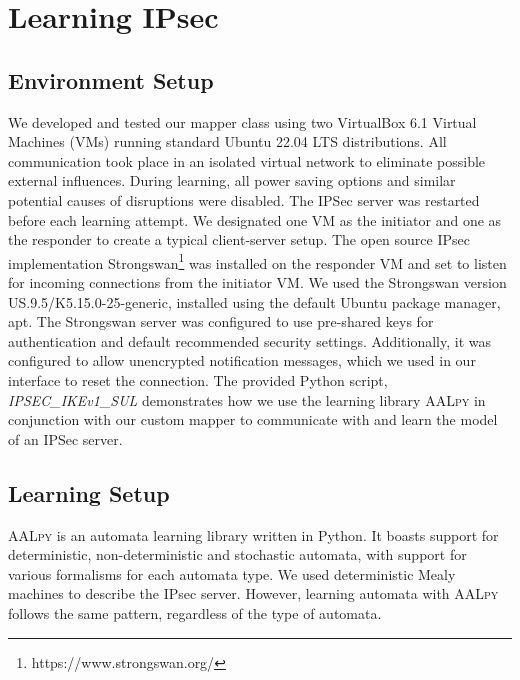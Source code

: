 \documentclass[runningheads]{llncs}
\begin{document}
\section{Learning IPsec} \label{chap:4} %
\subsection{Environment Setup} %
We developed and tested our mapper class using two VirtualBox 6.1 Virtual Machines (VMs) running standard Ubuntu 22.04 LTS distributions. All communication took place in an isolated virtual network to eliminate possible external influences. During learning, all power saving options and similar potential causes of disruptions were disabled. The IPSec server was restarted before each learning attempt. We designated one VM as the initiator and one as the responder to create a typical client-server setup. The open source IPsec implementation Strongswan\footnote{https://www.strongswan.org/} was installed on the responder VM and set to listen for incoming connections from the initiator VM. We used the Strongswan version US.9.5/K5.15.0-25-generic, installed using the default Ubuntu package manager, apt. The Strongswan server was configured to use pre-shared keys for authentication and default recommended security settings. Additionally, it was configured to allow unencrypted notification messages, which we used in our interface to reset the connection. The provided Python script, \emph{IPSEC\_IKEv1\_SUL} demonstrates how we use the learning library \textsc{AALpy} in conjunction with our custom mapper to communicate with and learn the model of an IPSec server.

\subsection{Learning Setup} %
\textsc{AALpy} is an automata learning library written in Python. It boasts support for deterministic, non-deterministic and stochastic automata, with support for various formalisms for each automata type. We used deterministic Mealy machines to describe the IPsec server. However, learning automata with \textsc{AALpy} follows the same pattern, regardless of the type of automata.
\end{document}
